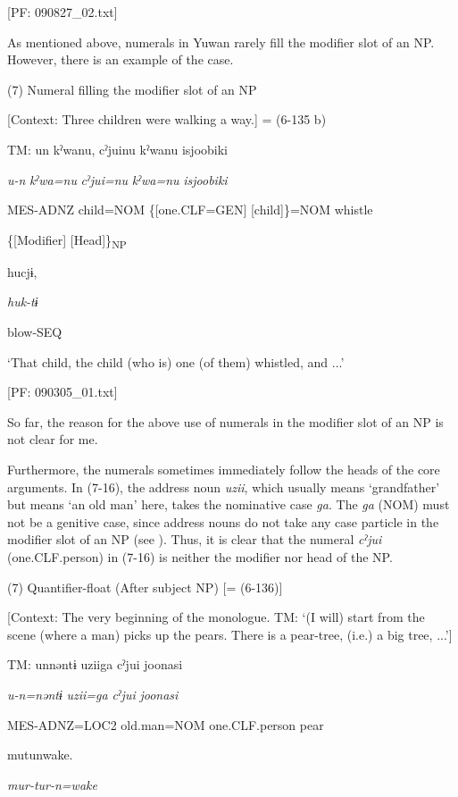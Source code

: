       [PF: 090827\_02.txt]

As mentioned above, numerals in Yuwan rarely fill the modifier slot of an NP. However, there is an example of the case.

(7)  Numeral filling the modifier slot of an NP

  [Context: Three children were walking a way.] = (6-135 b)

  TM:  un  kˀwanu,  cˀjuinu  kˀwanu  isjoobiki

    \textit{u-n}  \textit{kˀwa=nu}  \textit{cˀjui=nu}  \textit{kˀwa=nu}  \textit{isjoobiki}

    MES-ADNZ  child=NOM  \{[one.CLF=GEN]  [child]\}=NOM  whistle

        \{[Modifier]  [Head]\}\textsubscript{NP}  

    hucjɨ,

    \textit{huk-tɨ}

    blow-SEQ

    ‘That child, the child (who is) one (of them) whistled, and ...’

    [PF: 090305\_01.txt]

So far, the reason for the above use of numerals in the modifier slot of an NP is not clear for me.

Furthermore, the numerals sometimes immediately follow the heads of the core arguments. In (7-16), the address noun \textit{uzii}, which usually means ‘grandfather’ but means ‘an old man’ here, takes the nominative case \textit{ga}. The \textit{ga} (NOM) must not be a genitive case, since address nouns do not take any case particle in the modifier slot of an NP (see ). Thus, it is clear that the numeral \textit{cˀjui} (one.CLF.person) in (7-16) is neither the modifier nor head of the NP.

(7)  Quantifier-float (After subject NP) [= (6-136)]

  [Context: The very beginning of the monologue. TM: ‘(I will) start from the scene (where a man) picks up the pears. There is a pear-tree, (i.e.) a big tree, ...’]

  TM:  unnəntɨ  uziiga  cˀjui  joonasi

    \textit{u-n=nəntɨ}  \textit{uzii=ga}  \textit{cˀjui}  \textit{joonasi}

    MES-ADNZ=LOC2  old.man=NOM  one.CLF.person  pear

    mutunwake.

    \textit{mur-tur-n=wake}

